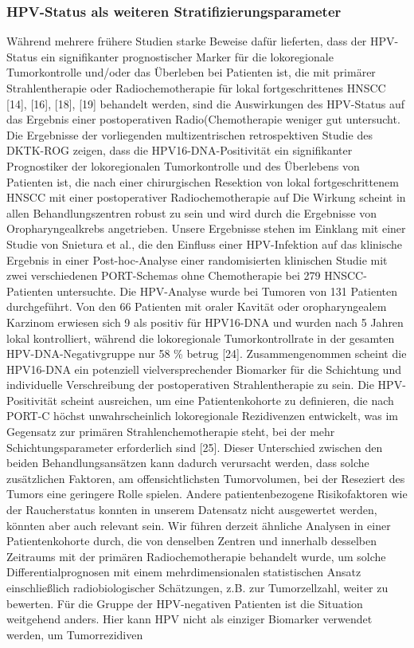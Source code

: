 \hypertarget{hpv-status-als-weiteren-stratifizierungsparameter}{%
\subsubsection{HPV-Status als weiteren Stratifizierungsparameter}\label{hpv-status-als-weiteren-stratifizierungsparameter}}

Während mehrere frühere Studien starke Beweise dafür lieferten, dass der HPV-Status ein signifikanter prognostischer Marker für die lokoregionale Tumorkontrolle und/oder das Überleben bei Patienten ist, die mit primärer Strahlentherapie oder Radiochemotherapie für lokal fortgeschrittenes HNSCC {[}14{]}, {[}16{]}, {[}18{]}, {[}19{]} behandelt werden, sind die Auswirkungen des HPV-Status auf das Ergebnis einer postoperativen Radio(Chemotherapie weniger gut untersucht. Die Ergebnisse der vorliegenden multizentrischen retrospektiven Studie des DKTK-ROG zeigen, dass die HPV16-DNA-Positivität ein signifikanter Prognostiker der lokoregionalen Tumorkontrolle und des Überlebens von Patienten ist, die nach einer chirurgischen Resektion von lokal fortgeschrittenem HNSCC mit einer postoperativer Radiochemotherapie auf Die Wirkung scheint in allen Behandlungszentren robust zu sein und wird durch die Ergebnisse von Oropharyngealkrebs angetrieben. Unsere Ergebnisse stehen im Einklang mit einer Studie von Snietura et al., die den Einfluss einer HPV-Infektion auf das klinische Ergebnis in einer Post-hoc-Analyse einer randomisierten klinischen Studie mit zwei verschiedenen PORT-Schemas ohne Chemotherapie bei 279 HNSCC-Patienten untersuchte. Die HPV-Analyse wurde bei Tumoren von 131 Patienten durchgeführt. Von den 66 Patienten mit oraler Kavität oder oropharyngealem Karzinom erwiesen sich 9 als positiv für HPV16-DNA und wurden nach 5 Jahren lokal kontrolliert, während die lokoregionale Tumorkontrollrate in der gesamten HPV-DNA-Negativgruppe nur 58 \% betrug {[}24{]}. Zusammengenommen scheint die HPV16-DNA ein potenziell vielversprechender Biomarker für die Schichtung und individuelle Verschreibung der postoperativen Strahlentherapie zu sein. Die HPV-Positivität scheint ausreichen, um eine Patientenkohorte zu definieren, die nach PORT-C höchst unwahrscheinlich lokoregionale Rezidivenzen entwickelt, was im Gegensatz zur primären Strahlenchemotherapie steht, bei der mehr Schichtungsparameter erforderlich sind {[}25{]}. Dieser Unterschied zwischen den beiden Behandlungsansätzen kann dadurch verursacht werden, dass solche zusätzlichen Faktoren, am offensichtlichsten Tumorvolumen, bei der Reseziert des Tumors eine geringere Rolle spielen. Andere patientenbezogene Risikofaktoren wie der Raucherstatus konnten in unserem Datensatz nicht ausgewertet werden, könnten aber auch relevant sein. Wir führen derzeit ähnliche Analysen in einer Patientenkohorte durch, die von denselben Zentren und innerhalb desselben Zeitraums mit der primären Radiochemotherapie behandelt wurde, um solche Differentialprognosen mit einem mehrdimensionalen statistischen Ansatz einschließlich radiobiologischer Schätzungen, z.B. zur Tumorzellzahl, weiter zu bewerten. Für die Gruppe der HPV-negativen Patienten ist die Situation weitgehend anders. Hier kann HPV nicht als einziger Biomarker verwendet werden, um Tumorrezidiven 